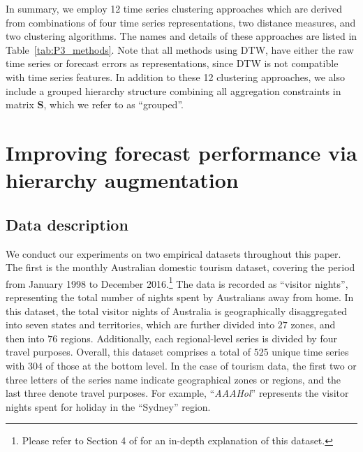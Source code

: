 \documentclass[a4paper,review,12pt,authoryear]{elsarticle}
\begin{document}
In summary, we employ 12 time series clustering approaches which are derived from combinations of four time series representations, two distance measures, and two clustering algorithms. The names and details of these approaches are listed in Table~\ref{tab:P3_methods}. Note that all methods using DTW, have either the raw time series or forecast errors as representations, since DTW is not compatible with time series features. {In addition to these 12 clustering approaches, we also include a grouped hierarchy structure combining all aggregation constraints in matrix $\boldsymbol{S}$, which we refer to as ``grouped''.} 



\section{Improving forecast performance via hierarchy augmentation}\label{sec:cluster}
\subsection{Data description}

We conduct our experiments on two empirical datasets throughout this paper. The first is the monthly Australian domestic tourism dataset, covering the period from January 1998 to December 2016.\footnote{Please refer to Section 4 of \cite{wickramasuriyaOptimalForecastReconciliation2019} for an in-depth explanation of this dataset.} The data is recorded as ``visitor nights'', representing the total number of nights spent by Australians away from home. In this dataset, the total visitor nights of Australia is geographically disaggregated into seven states and territories, which are further divided into $27$ zones, and then into $76$ regions. Additionally, each regional-level series is divided by four travel purposes. Overall, this dataset comprises a total of {$525$} unique time series with $304$ of those at the bottom level. In the case of tourism data, the first two or three letters of the series name indicate geographical zones or regions, and the last three denote travel purposes. For example, ``\textit{AAAHol}'' represents the visitor nights spent for holiday in the ``Sydney'' region.
\end{document}
